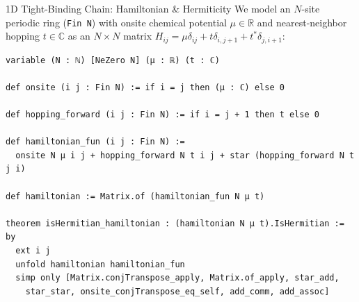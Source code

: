 \documentclass[aspectratio=169, 10pt]{beamer}
\begin{document}
\begin{frame}[fragile]{1D Tight-Binding Chain: Hamiltonian \& Hermiticity}
  We model an $N$-site periodic ring (\texttt{Fin N}) with onsite chemical potential $\mu \in \mathbb{R}$ and nearest-neighbor hopping $t \in \mathbb{C}$ as an $N \times N$ matrix $H_{ij} = \mu\delta_{ij} + t\delta_{i,j+1} + t^*\delta_{j,i+1}$:

  \vspace{0.05cm}
\begin{lstlisting}[language=Lean4]
variable (N : ℕ) [NeZero N] (μ : ℝ) (t : ℂ)

def onsite (i j : Fin N) := if i = j then (μ : ℂ) else 0

def hopping_forward (i j : Fin N) := if i = j + 1 then t else 0

def hamiltonian_fun (i j : Fin N) :=
  onsite N μ i j + hopping_forward N t i j + star (hopping_forward N t j i)

def hamiltonian := Matrix.of (hamiltonian_fun N μ t)

theorem isHermitian_hamiltonian : (hamiltonian N μ t).IsHermitian := by
  ext i j
  unfold hamiltonian hamiltonian_fun
  simp only [Matrix.conjTranspose_apply, Matrix.of_apply, star_add,
    star_star, onsite_conjTranspose_eq_self, add_comm, add_assoc]
\end{lstlisting}
\end{frame}
\end{document}
